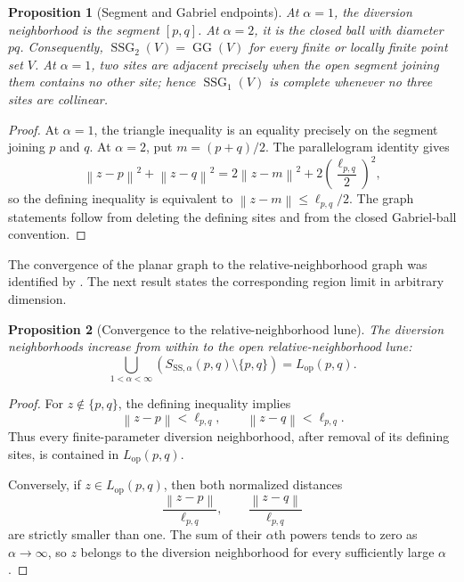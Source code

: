\documentclass[a4paper,fleqn]{cas-sc}
\newtheorem{proposition}{Proposition}
\theoremstyle{definition}
\theoremstyle{remark}
\newcommand{\norm}[1]{\left\lVert #1\right\rVert}
\newcommand{\ellpq}{\ell_{p,q}}
\newcommand{\0}{\mathbf{0}}
\DeclareMathOperator{\SSG}{SSG}
\DeclareMathOperator{\GG}{GG}
\begin{document}
\begin{proposition}[Segment and Gabriel endpoints]
\label{prop:special-cases}
At \(\alpha=1\), the diversion neighborhood is the segment \([p,q]\).
At \(\alpha=2\), it is the closed ball with diameter \(pq\). Consequently,
\(\SSG_2(V)=\GG(V)\) for every finite or locally finite point set \(V\).
At \(\alpha=1\), two sites are adjacent precisely when the open segment
joining them contains no other site; hence \(\SSG_1(V)\) is complete
whenever no three sites are collinear.
\end{proposition}

\begin{proof}
At \(\alpha=1\), the triangle inequality is an equality precisely on the
segment joining \(p\) and \(q\). At \(\alpha=2\), put
\(m=(p+q)/2\). The parallelogram identity gives
\begin{equation}
\norm{z-p}^2+\norm{z-q}^2
=
2\norm{z-m}^2+2\left(\frac{\ellpq}{2}\right)^2,
\end{equation}
so the defining inequality is equivalent to
\(\norm{z-m}\leq\ellpq/2\). The graph statements follow from deleting
the defining sites and from the closed Gabriel-ball convention.
\end{proof}


The convergence of the planar graph to the relative-neighborhood graph was
identified by \citet[Theorem~3.5]{kannangara2018stepping}. The next result
states the corresponding region limit in arbitrary dimension.

\begin{proposition}[Convergence to the relative-neighborhood lune]
\label{prop:rng-limit}
The diversion neighborhoods increase from within to the open
relative-neighborhood lune:
\begin{equation}\label{eq:open-lune-limit}
\bigcup_{1<\alpha<\infty}
\left(S_{\mathrm{SS},\alpha}(p,q)\setminus\{p,q\}\right)
=
L_{\mathrm{op}}(p,q).
\end{equation}
\end{proposition}

\begin{proof}
For \(z\notin\{p,q\}\), the defining inequality implies
\begin{equation}
\norm{z-p}<\ellpq,
\qquad
\norm{z-q}<\ellpq.
\end{equation}
Thus every finite-parameter diversion neighborhood, after removal of its
defining sites, is contained in \(L_{\mathrm{op}}(p,q)\).

Conversely, if \(z\in L_{\mathrm{op}}(p,q)\), then both normalized
distances
\begin{equation}
\frac{\norm{z-p}}{\ellpq},
\qquad
\frac{\norm{z-q}}{\ellpq}
\end{equation}
are strictly smaller than one. The sum of their \(\alpha\)th powers tends
to zero as \(\alpha\to\infty\), so \(z\) belongs to the diversion
neighborhood for every sufficiently large \(\alpha\).
\end{proof}
\end{document}
